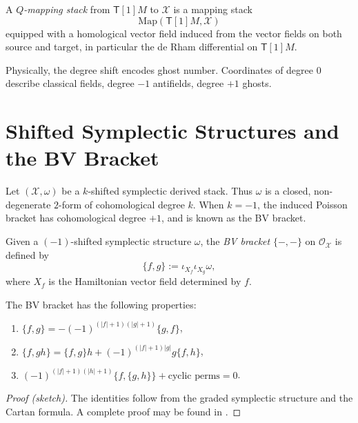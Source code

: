 \begin{definition}
A \emph{$Q$-mapping stack} from $\mathsf{T}[1]M$ to $\mathcal{X}$
is a mapping stack
\[
\mathrm{Map}(\mathsf{T}[1]M,\mathcal{X})
\]
equipped with a homological vector field induced from the
vector fields on both source and target, in particular
the de Rham differential on $\mathsf{T}[1]M$.
\end{definition}

\begin{remark}
Physically, the degree shift encodes ghost number.
Coordinates of degree $0$ describe classical fields,
degree $-1$ antifields, degree $+1$ ghosts.
\end{remark}


\section{Shifted Symplectic Structures and the BV Bracket}

Let $(\mathcal{X},\omega)$ be a $k$-shifted symplectic derived stack.
Thus $\omega$ is a closed, non-degenerate $2$-form of cohomological
degree $k$.
When $k=-1$, the induced Poisson bracket has cohomological degree $+1$,
and is known as the BV bracket.

\begin{definition}
Given a $(-1)$-shifted symplectic structure $\omega$,
the \emph{BV bracket} $\{-,-\}$ on
$\mathcal{O}_{\mathcal{X}}$ is defined by
\[
\{f,g\} := \iota_{X_f}\iota_{X_g}\omega,
\]
where $X_f$ is the Hamiltonian vector field determined by $f$.
\end{definition}

\begin{proposition}
The BV bracket has the following properties:
\begin{enumerate}
\item $\{f,g\} = -(-1)^{(|f|+1)(|g|+1)}\{g,f\}$,
\item $\{f,gh\} = \{f,g\}h + (-1)^{(|f|+1)|g|}g\{f,h\}$,
\item $(-1)^{(|f|+1)(|h|+1)}\{f,\{g,h\}\} + \text{cyclic perms} = 0$.
\end{enumerate}
\end{proposition}

\begin{proof}[Proof (sketch)]
The identities follow from the graded symplectic structure and the
Cartan formula. A complete proof may be found in
\cite{Schwarz93,CattaneoFelder02,PTVV13}.
\end{proof}


